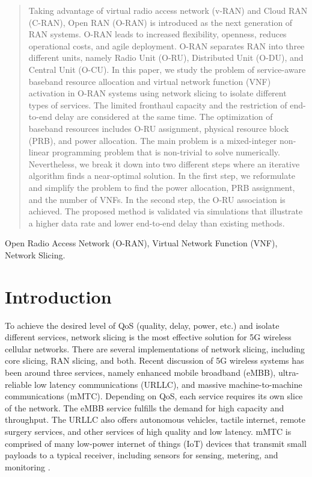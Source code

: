 \documentclass[lettersize,journal]{IEEEtran}
\begin{document}
\begin{abstract}
Taking advantage of virtual radio access network (v-RAN) and Cloud RAN (C-RAN), Open RAN (O-RAN) is introduced as the next generation of RAN systems. O-RAN leads to increased flexibility, openness, reduces operational costs, and agile deployment. O-RAN separates RAN into three different units, namely Radio Unit (O-RU), Distributed Unit (O-DU), and Central Unit (O-CU).
In this paper, we study the problem of service-aware baseband resource allocation and virtual network function (VNF) activation in O-RAN systems using network slicing to isolate different types of services.
The limited fronthaul capacity and the restriction of end-to-end delay are considered at the same time.
The optimization of baseband resources includes O-RU assignment, physical resource block (PRB), and power allocation. The main problem is a mixed-integer non-linear programming problem that is non-trivial to solve numerically.
Nevertheless, we break it down into two different steps where an iterative algorithm finds a near-optimal solution.
In the first step, we reformulate and simplify the problem to find the power allocation, PRB assignment, and the number of VNFs. In the second step, the O-RU association is achieved.
The proposed method is validated via simulations that illustrate a higher data rate and lower end-to-end delay than existing methods. 
\end{abstract}
\begin{IEEEkeywords}
Open Radio Access Network (O-RAN), Virtual Network Function (VNF), Network Slicing.
\end{IEEEkeywords}
\section{Introduction} 
To achieve the desired level of QoS (quality, delay, power, etc.) and isolate different services, network slicing is the most effective solution for 5G wireless cellular networks. There are several implementations of network slicing, including core slicing, RAN slicing, and both. 
Recent discussion of 5G wireless systems has been around three services, namely enhanced mobile broadband (eMBB), ultra-reliable low latency communications (URLLC), and massive machine-to-machine communications (mMTC). Depending on QoS, each service requires its own slice of the network.
The eMBB service fulfills the demand for high capacity and throughput. The URLLC also offers autonomous vehicles, tactile internet, remote surgery services, and other services of high quality and low latency. mMTC is comprised of many low-power internet of things (IoT) devices that transmit small payloads to a typical receiver, including sensors for sensing, metering, and monitoring
\cite{shen2020ai,setayesh2020joint,popovski20185g,dogra2020survey,kassab2018coexistence,alsenwi2021intelligent}.
\end{document}
